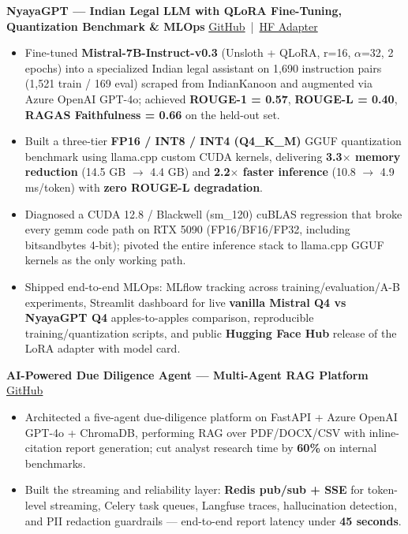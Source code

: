\documentclass[11pt,a4paper]{article}
\newcommand{\projectHeading}[2]{
  \textbf{#1} \hfill #2
}
\begin{document}
\projectHeading{NyayaGPT --- Indian Legal LLM with QLoRA Fine-Tuning, Quantization Benchmark \& MLOps}{\href{https://github.com/gauravgarwal9011/NyayGPT}{GitHub} \,|\, \href{https://huggingface.co/gauravgarwal/NyayaGPT-Mistral7B-adapter}{HF Adapter}}
\begin{itemize}
    \item Fine-tuned \textbf{Mistral-7B-Instruct-v0.3} (Unsloth + QLoRA, r=16, $\alpha$=32, 2 epochs) into a specialized Indian legal assistant on 1{,}690 instruction pairs (1{,}521 train / 169 eval) scraped from IndianKanoon and augmented via Azure OpenAI GPT-4o; achieved \textbf{ROUGE-1 = 0.57}, \textbf{ROUGE-L = 0.40}, \textbf{RAGAS Faithfulness = 0.66} on the held-out set.
    \item Built a three-tier \textbf{FP16 / INT8 / INT4 (Q4\_K\_M)} GGUF quantization benchmark using llama.cpp custom CUDA kernels, delivering \textbf{3.3$\times$ memory reduction} (14.5 GB $\rightarrow$ 4.4 GB) and \textbf{2.2$\times$ faster inference} (10.8 $\rightarrow$ 4.9 ms/token) with \textbf{zero ROUGE-L degradation}.
    \item Diagnosed a CUDA 12.8 / Blackwell (sm\_120) cuBLAS regression that broke every gemm code path on RTX 5090 (FP16/BF16/FP32, including bitsandbytes 4-bit); pivoted the entire inference stack to llama.cpp GGUF kernels as the only working path.
    \item Shipped end-to-end MLOps: MLflow tracking across training/evaluation/A-B experiments, Streamlit dashboard for live \textbf{vanilla Mistral Q4 vs NyayaGPT Q4} apples-to-apples comparison, reproducible training/quantization scripts, and public \textbf{Hugging Face Hub} release of the LoRA adapter with model card.
\end{itemize}

\projectHeading{AI-Powered Due Diligence Agent --- Multi-Agent RAG Platform}{\href{https://github.com/gauravgarwal9011/due-diligence-agent}{GitHub}}
\begin{itemize}
    \item Architected a five-agent due-diligence platform on FastAPI + Azure OpenAI GPT-4o + ChromaDB, performing RAG over PDF/DOCX/CSV with inline-citation report generation; cut analyst research time by \textbf{60\%} on internal benchmarks.
    \item Built the streaming and reliability layer: \textbf{Redis pub/sub + SSE} for token-level streaming, Celery task queues, Langfuse traces, hallucination detection, and PII redaction guardrails --- end-to-end report latency under \textbf{45 seconds}.
\end{itemize}
\end{document}

